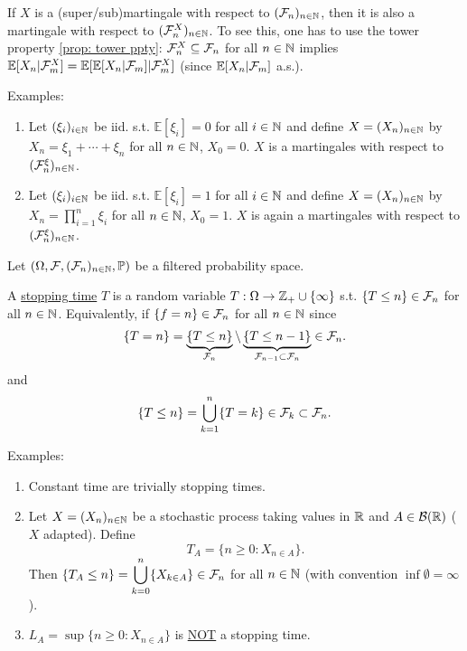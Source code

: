 \documentclass{article}
\begin{document}
\begin{remark}
	If $  X$ is a (super/sub)martingale with respect to $ (\mathcal{F}_{n})_{n\in\mathbb{N}}$, then it is also a martingale with respect to $ (\mathcal{F}^{X}_{n})_{n\in \mathbb{N}}$. To see this, one has to use the tower property \ref{prop: tower ppty}: $ \mathcal{F}^{X}_{n}\subseteq \mathcal{F}_{n}$ for all $ n\in\mathbb{N}$ implies $ \mathbb{E}[X_{n}|\mathcal{F}^{X}_{m}]= \mathbb{E}[ \mathbb{E}[X_{n}|\mathcal{F}_{m}]|\mathcal{F}^{X}_{m}]$ (since $ \mathbb{E}[X_{n}|\mathcal{F}_{m}]$ a.s.).
\end{remark}

\begin{examplesblock}{Examples: }\label{examples: 2}
\begin{enumerate}
	\item Let  $ (\xi_{i})_{i\in \mathbb{N}}$ be iid. s.t. $ \mathbb{E}[\xi_{i}]=0$ for all $ i\in\mathbb{N}$ and define $ X = (X_{n})_{n\in\mathbb{N}}$ by $ X_{n} = \xi_{1}+\cdots +\xi_{n}$ for all $ n\in\mathbb{N}$, $ X_{0} = 0$. $ X$ is a martingales with respect to $ (\mathcal{F}^{\xi}_{n})_{n\in\mathbb{N}}$.
	\item Let  $ (\xi_{i})_{i\in \mathbb{N}}$ be iid. s.t. $ \mathbb{E}[\xi_{i}]=1$ for all $ i\in\mathbb{N}$ and define $ X = (X_{n})_{n\in\mathbb{N}}$ by $ X_{n} = \displaystyle\prod^{n}_{i=1}\xi_{i}$ for all $ n\in\mathbb{N}$, $ X_{0} = 1$. $ X$ is again a martingales with respect to $ (\mathcal{F}^{\xi}_{n})_{n\in\mathbb{N}}$.

\end{enumerate}

\end{examplesblock}

Let $ (\Omega, \mathcal{F}, (\mathcal{F}_{n})_{n\in \mathbb{N}}, \mathbb{P})$ be a filtered probability space.

\begin{boxdef}\label{def: stopping time discrete}
	A \underline{stopping time} $ T$ is a random variable $ T:\Omega\to \mathbb{Z}_{+}\cup \{\infty\}$ s.t. $ \{T\leq n\}\in \mathcal{F}_{n}$ for all $ n\in \mathbb{N}$. Equivalently, if $ \{f=n\}\in \mathcal{F}_{n}$ for all $ n\in \mathbb{N}$ since 
	\[
		\{T=n\}=\underbrace{\{T\leq n\}}_{\mathcal{F}_{n}}\setminus \underbrace{\{T\leq n-1\}}_{\mathcal{F}_{n-1}\subset \mathcal{F}_{n}}\in \mathcal{F}_{n}.
	\]
and 
\[
	\{T\leq n\} =\displaystyle\bigcup^{n}_{k=1}\{T=k\}\in \mathcal{F}_{k}\subset \mathcal{F}_{n}.
\]

\end{boxdef}

\begin{examplesblock}{Examples: }\label{examples: 3}
\begin{enumerate}
	\item Constant time are trivially stopping times.
	\item Let $ X = (X_{n})_{n\in\mathbb{N}}$ be a stochastic process taking values in $ \mathbb{R}$ and $ A\in  \mathcal{B}(\mathbb{R})$ ($ X$ adapted). Define 
		\[
			T_{A} = \{n\geq 0: X_{n\in A}\}.
		\]
		Then $ \{T_{A}\leq n \} =\displaystyle\bigcup^{n}_{k=0}\{X_{k\in A}\}\in \mathcal{F}_{n} $ for all $ n\in\mathbb{N}$ (with convention $ \inf \emptyset = \infty$).
	\item $ L_{A} = \sup\{n\geq 0: X_{n\in A}\}$ is \underline{NOT} a stopping time.	
\end{enumerate}
\end{examplesblock}
\end{document}
